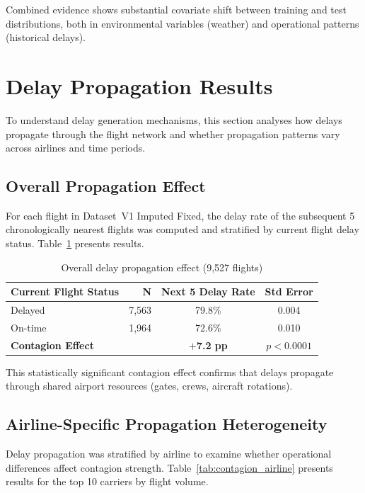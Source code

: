 \documentclass{report}
\begin{document}
Combined evidence shows substantial covariate shift between training and
test distributions, both in environmental variables (weather) and operational
patterns (historical delays).

\section{Delay Propagation Results}
\label{sec:propagation}

To understand delay generation mechanisms, this section analyses how delays
propagate through the flight network and whether propagation patterns vary
across airlines and time periods.

\subsection{Overall Propagation Effect}

For each flight in Dataset~V1 Imputed Fixed, the delay rate of the subsequent
5 chronologically nearest flights was computed and stratified by current
flight delay status.  Table~\ref{tab:propagation} presents results.

\begin{table}[H]
\centering
\caption{Overall delay propagation effect (9,527 flights)}
\label{tab:propagation}
\begin{tabular}{lrcc}
\toprule
\textbf{Current Flight Status} & \textbf{N} &
  \textbf{Next 5 Delay Rate} & \textbf{Std Error} \\
\midrule
Delayed  & 7,563 & 79.8\% & 0.004 \\
On-time  & 1,964 & 72.6\% & 0.010 \\
\textbf{Contagion Effect} & & \textbf{$+$7.2 pp} & $p < 0.0001$ \\
\bottomrule
\end{tabular}
\end{table}

This statistically significant contagion effect confirms that delays
propagate through shared airport resources (gates, crews, aircraft
rotations).

\subsection{Airline-Specific Propagation Heterogeneity}

Delay propagation was stratified by airline to examine whether operational
differences affect contagion strength.  Table~\ref{tab:contagion_airline} presents results for the top 10 carriers by flight volume.
\end{document}
